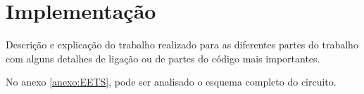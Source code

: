 \chapter{Implementação}

Descrição e explicação do trabalho realizado para as diferentes partes do trabalho com alguns detalhes de ligação ou de partes do código mais importantes.

No anexo \ref{anexo:EETS}, pode ser analisado o esquema completo do circuito.